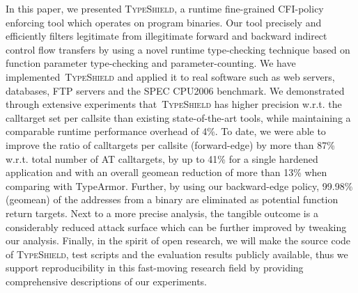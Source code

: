 In this paper, we presented \textsc{TypeShield}, a runtime fine-grained CFI-policy enforcing tool which 
operates on program binaries. Our tool precisely and efficiently filters legitimate from 
illegitimate forward and backward indirect control flow transfers by using a novel runtime type-checking 
technique based on function parameter type-checking and parameter-counting. 
We have implemented~\textsc{TypeShield} and applied it to real software such as web servers, databases, FTP servers and the SPEC CPU2006 benchmark. 
We demonstrated through extensive experiments that~\textsc{TypeShield} has 
higher precision w.r.t. the calltarget set per callsite than existing state-of-the-art tools, while maintaining a comparable runtime performance overhead of 4\%. 
To date, we were able to improve the ratio of calltargets per callsite (forward-edge) by more than 87\% w.r.t. total number of AT calltargets, 
by up to 41\% for a single hardened application and with an overall geomean reduction of more than 13\% when comparing with TypeArmor.
Further, by using our backward-edge policy, 99.98\% (geomean) of the addresses from a binary are eliminated as potential function return targets.
Next to a more precise analysis, the tangible outcome is a considerably reduced attack surface which can be further improved by 
tweaking our analysis. Finally, in the spirit of open research, we will make the source code of \textsc{TypeShield}, test scripts and the evaluation results publicly available, 
thus we support reproducibility in this fast-moving research field by providing comprehensive descriptions of our experiments.


